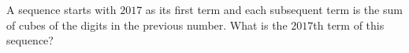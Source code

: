 A sequence starts with $2017$ as its first term and each subsequent term is the sum of cubes of the digits in the previous number. What is the $2017$th term of this sequence?